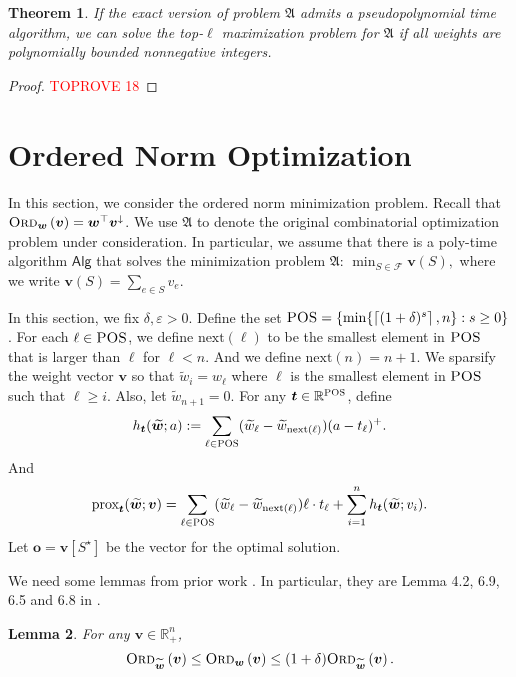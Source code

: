 \documentclass[11pt,a4paper]{article} \usepackage{enumitem}
\newcommand{\ceil}[1]{\left\lceil #1 \right\rceil}
\newcommand{\calF}{\mathcal{F}}
\newcommand{\ww}{\boldsymbol{\widetilde{w}}}
\newcommand{\da}{\downarrow}
\newcommand{\boldv}{\boldsymbol{v}}
\newcommand{\boldw}{\boldsymbol{w}}
\newcommand{\boldt}{\boldsymbol{t}}
\newcommand{\myproblem}{\mathfrak{A}}
\newcommand{\Algo}{\mathsf{Alg}}
\newcommand{\ordered}[2]{\textsc{Ord}_{#1}\left(#2\right)}
\newcommand{\R}{\mathbb{R}}
\newcommand{\Rpos}{\mathbb{R}_+}
\newcommand{\POS}{\textsc{POS}}
\newtheorem{theorem}{Theorem}[section]
\newtheorem{lemma}[theorem]{Lemma}
\theoremstyle{definition}
\begin{document}
\begin{theorem}
If the exact version of problem $\myproblem$ admits a pseudopolynomial time
algorithm, we can solve the top-$\ell$ {\em maximization} problem for 
$\myproblem$ if all weights are polynomially bounded nonnegative integers.
\end{theorem}
\begin{proof}\textcolor{red}{TOPROVE 18}\end{proof}


\section{Ordered Norm Optimization} \label{sec:ordered-norm}


In this section, we consider the ordered norm minimization problem.
Recall that $\ordered{\boldw}{\boldv}=\boldw^\top\boldv^\da$.
We use $\myproblem$ to denote the original combinatorial optimization problem
under consideration.
In particular, we assume that there is a poly-time algorithm $\Algo$ 
that solves the minimization problem $\myproblem$:
$
\min_{S\in \calF} \boldv(S), 
$
where we write $\boldv(S)=\sum_{e\in S}v_e$.

In this section, we fix $\delta,\varepsilon>0$.
Define the set $\POS=\{\min\{\ceil{(1+\delta)^s},n\}:s\geq 0\}$.
For each $\ell\in\POS$, we define $\text{next}(\ell)$ to be the smallest element in $\POS$ that is larger than $\ell$ for $\ell<n$.
And we define $\text{next}(n)=n+1$.
We sparsify the weight vector $\boldv$ so that $\widetilde{w}_i=w_\ell$ where $\ell$ is the smallest element in $\POS$ such that $\ell\ge i$.
Also, let $\widetilde{w}_{n+1}=0$.
For any $\boldt\in \R^{\POS}$, define
$$h_{\boldt}(\ww;a):=\sum_{\ell\in\POS}(\widetilde{w}_\ell-\widetilde{w}_{\text{next}(\ell)})(a-t_\ell)^+.$$
And
$$\text{prox}_{\boldt}(\ww;\boldv)=\sum_{\ell\in\POS}(\widetilde{w}_\ell-\widetilde{w}_{\text{next}(\ell)})\ell\cdot t_\ell+\sum_{i=1}^n h_{\boldt}(\ww;v_i).$$
Let $\boldsymbol{o}=\boldv[S^\star]$ be the vector for the optimal solution.

We need some lemmas from prior work \cite{chakrabarty2019approximation}.
In particular, they are Lemma 4.2, 6.9, 6.5 and 6.8 in \cite{chakrabarty2019approximation}.

\begin{lemma}
\label{lm:C.1}
For any $\boldv\in\Rpos^n$, 
$$\ordered{\widetilde{\boldw}}{\boldv}\leq \ordered{\boldw}{\boldv}\leq 
(1+\delta)\ordered{\widetilde{\boldw}}{\boldv}.$$
\end{lemma}
\end{document}
